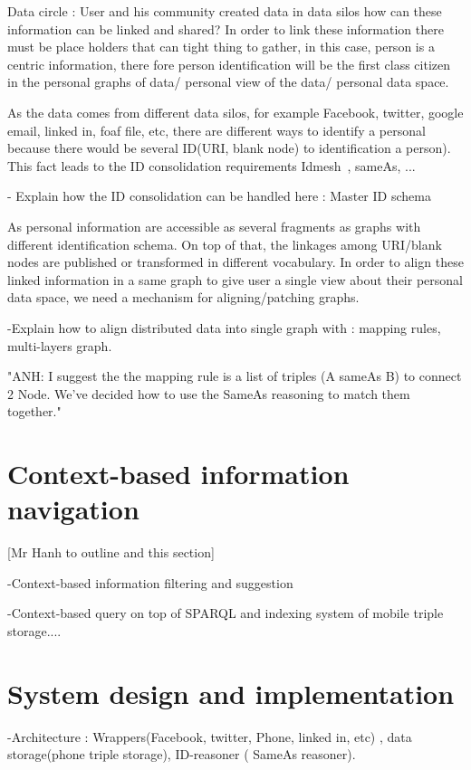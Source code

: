 \documentclass[runningheads,a4paper]{llncs}
\begin{document}
Data circle : User and his community created data in data silos how can these information can be linked and shared? 
In order to link these information there must be place holders that can tight thing to gather, in this case, person is a centric information,
there fore person identification will be the first class citizen in the personal graphs of data/ personal view of the data/ personal data space. 

As the data comes from different data silos, for example Facebook, twitter, google email, linked in, foaf file, etc, there are different ways to identify 
a personal because there would be several ID(URI, blank node) to identification a person). This fact leads to the  
ID consolidation requirements  Idmesh~\cite{Cudre-Mauroux:2009}, sameAs, ...

- Explain how the ID consolidation can be handled here : Master ID schema


As personal information are accessible as several fragments as graphs with different identification schema. On top of that, the linkages among 
URI/blank nodes are published or transformed in different vocabulary. In order to align these linked information in a same graph to give user a single
view about their personal data space, we need a mechanism for aligning/patching graphs. 

-Explain how to align distributed data into single graph with : mapping rules, multi-layers graph.
 
"ANH: I suggest the the mapping rule is a list of triples (A sameAs B) to connect 2 Node. We've decided how to use the SameAs reasoning to match them together."


\section{Context-based information navigation}

[Mr Hanh to outline and  this section]
 
-Context-based information filtering and suggestion

-Context-based query on top of SPARQL and indexing system of mobile triple storage....

\section{System design and implementation}

-Architecture : Wrappers(Facebook, twitter, Phone, linked in, etc) , data storage(phone triple storage), 
ID-reasoner ( SameAs reasoner).
   
\end{document}
